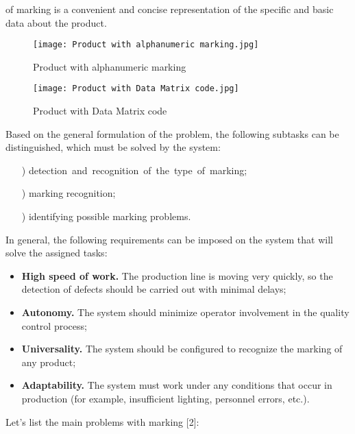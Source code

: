 \documentclass[a4paper, twocolumn]{article}
\begin{document}
\setcounter{chapter}{3}
\setcounter{page}{220}

of marking is a convenient and concise representation of
the specific and basic data about the product.

\begin{figure}[h]
\centering
\texttt{[image: Product with alphanumeric marking.jpg]}
\caption{Product with alphanumeric marking}
\label{fig:pam}
\end{figure}

\begin{figure}[h]
\centering
\texttt{[image: Product with Data Matrix code.jpg]}
\caption{Product with Data Matrix code}
\label{fig:pdm}
\end{figure}

Based on the general formulation of the problem, the
following subtasks can be distinguished, which must be
solved by the system:

\begin{enumerate}
    \addtocounter{i}{1}
    \item[\arabic{i})] \mbox{detection and recognition of the type of marking;}
    \addtocounter{i}{1}
    \item[\arabic{i})] marking recognition;
    \addtocounter{i}{1}
    \item[\arabic{i})] identifying possible marking problems.
\end{enumerate}

In general, the following requirements can be imposed
on the system that will solve the assigned tasks:

\begin{itemize}
    \item  \textbf{High speed of work.} The production line is moving
    very quickly, so the detection of defects should be
    carried out with minimal delays;
    \item  \textbf{Autonomy.} The system should minimize operator
    involvement in the quality control process;
    \item \textbf{Universality.} The system should be configured to
    recognize the marking of any product;
    \item \textbf{Adaptability.} The system must work under any
conditions that occur in production (for example,
insufficient lighting, personnel errors, etc.).
\end{itemize}

Let’s list the main problems with marking [2]:
\end{document}
